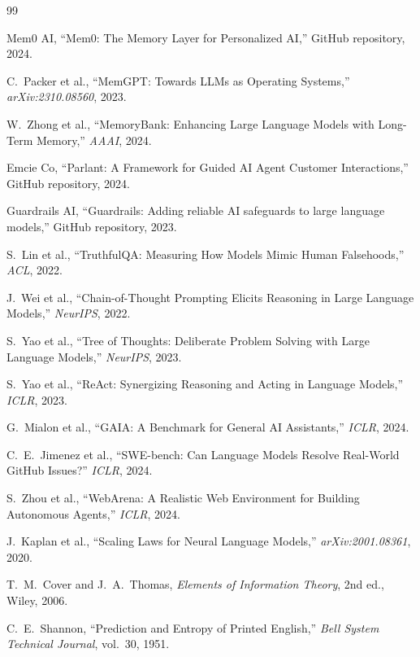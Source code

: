 \documentclass[11pt,a4paper]{article}
\begin{document}
\begin{thebibliography}{99}

 Mem0 AI, ``Mem0: The Memory Layer for Personalized AI,''
  GitHub repository, 2024.

 C.~Packer et al., ``MemGPT: Towards LLMs as Operating
  Systems,'' \emph{arXiv:2310.08560}, 2023.

 W.~Zhong et al., ``MemoryBank: Enhancing Large Language
  Models with Long-Term Memory,'' \emph{AAAI}, 2024.

 Emcie Co, ``Parlant: A Framework for Guided AI Agent
  Customer Interactions,'' GitHub repository, 2024.

 Guardrails AI, ``Guardrails: Adding reliable AI safeguards
  to large language models,'' GitHub repository, 2023.

 S.~Lin et al., ``TruthfulQA: Measuring How Models Mimic
  Human Falsehoods,'' \emph{ACL}, 2022.

 J.~Wei et al., ``Chain-of-Thought Prompting Elicits Reasoning
  in Large Language Models,'' \emph{NeurIPS}, 2022.

 S.~Yao et al., ``Tree of Thoughts: Deliberate Problem Solving
  with Large Language Models,'' \emph{NeurIPS}, 2023.



 S.~Yao et al., ``ReAct: Synergizing Reasoning and Acting in
  Language Models,'' \emph{ICLR}, 2023.

 G.~Mialon et al., ``GAIA: A Benchmark for General AI
  Assistants,'' \emph{ICLR}, 2024.

 C.~E.~Jimenez et al., ``SWE-bench: Can Language Models
  Resolve Real-World GitHub Issues?'' \emph{ICLR}, 2024.

 S.~Zhou et al., ``WebArena: A Realistic Web Environment
  for Building Autonomous Agents,'' \emph{ICLR}, 2024.

 J.~Kaplan et al., ``Scaling Laws for Neural Language
  Models,'' \emph{arXiv:2001.08361}, 2020.

 T.~M.~Cover and J.~A.~Thomas, \emph{Elements of
  Information Theory}, 2nd ed., Wiley, 2006.

 C.~E.~Shannon, ``Prediction and Entropy of Printed
  English,'' \emph{Bell System Technical Journal}, vol.~30, 1951.


\end{thebibliography}
\end{document}
